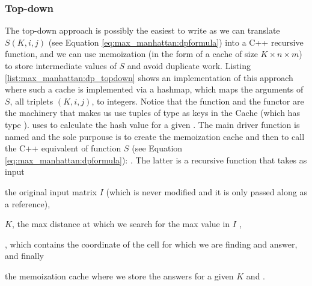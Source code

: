 \subsubsection{Top-down}
\label{sec:max_manhattan:topdown}
The top-down approach is possibly the easiest to write as we can  translate $S(K,i,j)$ (see Equation
\ref{eq:max_manhattan:dpformula}) into a C++ recursive function, and we can use memoization (in the
form of a cache of size $K\times n\times m$) to store intermediate values of $S$ and avoid duplicate
work. Listing \ref{list:max_manhattan:dp_topdown} shows an implementation of this approach where
such a cache is implemented via a hashmap, which maps the arguments of $S$, all triplets $(K,i,j)$,
to integers. Notice that the function  and the functor  are
the machinery that makes us use tuples of type  as keys in the Cache
(which has type ).  uses  to
calculate the hash value for a given . The main driver function is
named  and the sole purpouse is to create the
memoization cache and then to call the C++ equivalent of function $S$ (see Equation
\ref{eq:max_manhattan:dpformula}): . The
latter is a recursive function that takes as input
\begin{enumerate*}
	\item the original input matrix $I$ (which is never modified and it is only passed along as a
	reference),
	\item $K$, the max distance at which we search for the max value in $I$ ,
	\item {}, which contains the coordinate of the cell for which we are finding and
	answer, and finally
	\item the memoization cache where we store the answers for a given $K$ and .
\end{enumerate*}

